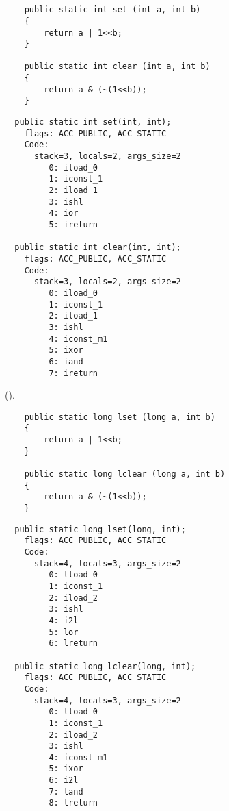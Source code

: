 \section{}


\begin{lstlisting}
	public static int set (int a, int b) 
	{
		return a | 1<<b;
	}

	public static int clear (int a, int b) 
	{
		return a & (~(1<<b));
	}
\end{lstlisting}

\begin{lstlisting}
  public static int set(int, int);
    flags: ACC_PUBLIC, ACC_STATIC
    Code:
      stack=3, locals=2, args_size=2
         0: iload_0       
         1: iconst_1      
         2: iload_1       
         3: ishl          
         4: ior           
         5: ireturn       

  public static int clear(int, int);
    flags: ACC_PUBLIC, ACC_STATIC
    Code:
      stack=3, locals=2, args_size=2
         0: iload_0       
         1: iconst_1      
         2: iload_1       
         3: ishl          
         4: iconst_m1     
         5: ixor          
         6: iand          
         7: ireturn       
\end{lstlisting}

 ().


\begin{lstlisting}
	public static long lset (long a, int b) 
	{
		return a | 1<<b;
	}

	public static long lclear (long a, int b) 
	{
		return a & (~(1<<b));
	}
\end{lstlisting}

\begin{lstlisting}
  public static long lset(long, int);
    flags: ACC_PUBLIC, ACC_STATIC
    Code:
      stack=4, locals=3, args_size=2
         0: lload_0       
         1: iconst_1      
         2: iload_2       
         3: ishl          
         4: i2l           
         5: lor           
         6: lreturn       

  public static long lclear(long, int);
    flags: ACC_PUBLIC, ACC_STATIC
    Code:
      stack=4, locals=3, args_size=2
         0: lload_0       
         1: iconst_1      
         2: iload_2       
         3: ishl          
         4: iconst_m1     
         5: ixor          
         6: i2l           
         7: land          
         8: lreturn       
\end{lstlisting}

